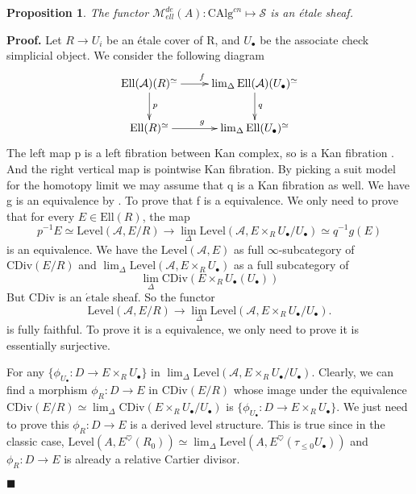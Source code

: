 \documentclass[12pt]{article}
\newtheorem{proposition}[theorem]{Proposition}
\theoremstyle{thry}
\renewenvironment{proof}
{\par \noindent \textbf{Proof.}}
{ \par \hfill $\blacksquare$ \quad \par }
\def  \CAlg     {\mathrm{CAlg}}
\def  \etale    {\acute{e}\text{tale}}
\def  \CDiv     {\mathrm{CDiv}}
\def  \Ell      {\mathrm{Ell}}
\def  \Level    {\mathrm{Level}}
\def  \ca       {\mathcal{A}}
\def  \cm       {\mathcal{M}}
\def  \cs       {\mathcal{S}}
\begin{document}
\begin{proposition}
	The functor $\cm_{ell}^{de}(A): \CAlg^{cn}  \mapsto  \cs$ is an \'etale sheaf. 
\end{proposition}
\begin{proof}
	Let $R \to {U_i}$ be an \'etale cover of R, and $U_{\bullet}$ be the associate check simplicial object.
	We consider the following diagram
	$$
	\xymatrix{
		\Ell(\ca)(R)^{\simeq}  \ar[r]^{f}  \ar[d]^{p}  &   \lim_{\Delta} \Ell(\ca)(U_{\bullet})^{\simeq}  \ar[d]^{q}  \\
		\Ell(R)^{\simeq}  \ar[r]^{g}    &   \lim_{\Delta} \Ell(U_{\bullet})^{\simeq}  \\
	}
	$$
	The left map p is  a left  fibration between Kan complex, so is a  Kan fibration \cite[Lemma 2.1.3.3]{lu-HTT}. And the right vertical map is pointwise Kan fibration. By picking a suit model for the homotopy limit we may assume that q is a Kan fibration as well.  We have g is an equivalence by \cite[Lemma 2.4.1]{lu-EC1}. To prove that f is a equivalence. We only need to prove that for every $E \in \Ell(R)$, the map
	$$
	p^{-1}{E} \simeq  \Level(\ca , E/R)   \to   \lim_{\Delta} \Level (\ca, E \times_R  U_{\bullet}/U_{\bullet}) \simeq q^{-1}g(E)
	$$
	is an equivalence. We have the $\Level(\ca, E)$ as full $\infty$-subcategory of $\CDiv(E/R)$ and
	$  \lim_{\Delta} \Level(\ca, E \times_R U_{\bullet})$ as a full subcategory of  
	$$
	\lim_{\Delta} \CDiv( E \times_R U_{\bullet}(U_{\bullet})) 
	$$
	But $\CDiv$ is an $\etale$ sheaf. So the functor
	$$
	\Level(\ca,E/R) \to   \lim_{\Delta} \Level(\ca, E \times_R U_{\bullet}/U_{\bullet}).
	$$
	is fully faithful. To prove it is a equivalence, we only need to prove it is essentially surjective.
	
	For any  $\{\phi_{U_{\bullet}}: D \to E \times_R {U_{\bullet}}\}$  in $\lim_{\Delta} \Level(\ca, E \times_R U_{\bullet}/U_{\bullet})$.  Clearly, we can find a morphism $\phi_R: D \to E$  in $\CDiv(E/R)$  whose image under the equivalence $\CDiv(E/R) \simeq  \lim_{\Delta}\CDiv( E \times _R U_{\bullet}/U_{\bullet})$ is $\{\phi_{U_{\bullet}}: D \to E \times_R U_{\bullet}\}$. We just need to prove this  $\phi_R: D \to E $ is a derived level structure. This is true since in the classic case, $\Level(A, E^{\heartsuit}(R_0)) \simeq  \lim_{\Delta}\Level(A, E^{\heartsuit}( \tau_{\leq 0}U_{\bullet}))$ and $\phi_R: D \to E$ is already a relative Cartier divisor.
\end{proof}
\end{document}
